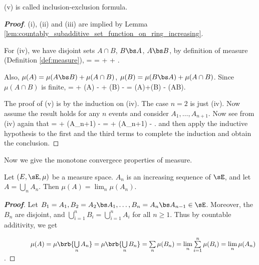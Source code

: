 \begin{remark}
(v) is called inclusion-exclusion formula.
\end{remark}

\begin{proof}[\bf Proof]
(i), (ii) and (iii) are implied by Lemma \ref{lem:countably_subadditive_set_function_on_ring_increasing}.

For (iv), we have disjoint sets $A\cap B$, $B\bs A$, $A\bs B$, by definition of measure (Definition \ref{def:measure}),
\be
\mu{} = \mu {} = \mu{} + \mu{} + \mu{}.
\ee

Also, $\mu(A) = \mu(A\bs B) + \mu(A\cap B)$, $\mu(B) = \mu(B\bs A) + \mu(A\cap B)$. Since $\mu(A\cap B)$ is finite,
\be
\mu{} = \mu{} + \mu(A) - \mu{} + \mu(B) - \mu{} = \mu(A)+\mu(B) - \mu(A\cap B).
\ee

The proof of (v) is by the induction on (iv). The case $n = 2$ is just (iv). Now assume the result holds for any $n$ events and consider $A_1,\dots,A_{n+1}$. Now see from (iv) again that
\be\label{equ:inclusion_exclusion_measure}
\mu{} = \mu{} + \mu(A_{n+1}) - \mu{}\nonumber = \mu{} + \mu(A_{n+1}) - \mu{}.
\ee
and then apply the inductive hypothesis to the first and the third terms to complete the induction and obtain the conclusion.
\end{proof}



Now we give the monotone convergece properties of measure.

\begin{lemma}\label{lem:measure_increasing_sequence}
Let $(E,\sE,\mu)$ be a measure space. $A_n$ is an increasing sequence of $\sE$, and let $A=\bigcup_n A_n$. Then $\mu(A) = \lim_n\mu(A_n)$.
\end{lemma}

\begin{proof}[\bf Proof]
Let $B_1=A_1,B_2 = A_2\bs A_1, \dots, B_n = A_n\bs A_{n-1}\in \sE$. Moreover, the $B_n$ are disjoint, and $\bigcup^n_{i=1}B_i = \bigcup^n_{i=1}A_i$ for all $n\geq 1$. Thus by countable additivity, we get
\vspace{2mm}

$\quad\quad\quad\quad\mu(A) = \mu\brb{\bigcup\limits_n A_n} = \mu\brb{\bigcup\limits_n B_n} = \sum\limits_n \mu(B_n) = \lim\limits_n\sum\limits^n_{i=1}\mu(B_i) = \lim\limits_n \mu(A_n)$.
\end{proof}

